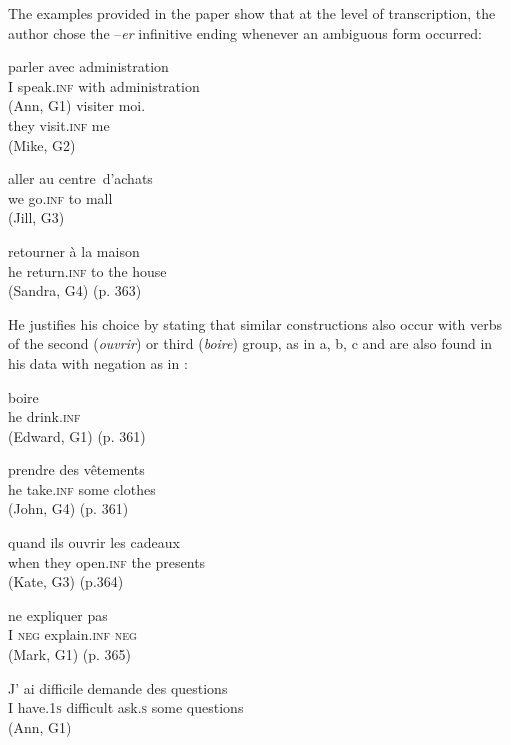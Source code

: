 \documentclass[output=paper,colorlinks,citecolor=brown,modfonts,nonflat]{../langscibook}
\begin{document}
The examples provided in the paper show that at the level of transcription, the author chose the –\textit{er} infinitive ending whenever an ambiguous form occurred:

\ea%
    \label{ex:leclerq:4}
\ea {} {parler} {avec} {administration}\\
    I speak.\textsc{inf} with administration\\
    (Ann, G1)
\ex
{} {visiter} {moi.}\\
    they visit.\textsc{inf} me\\
    (Mike, G2)

\ex
{} {aller} {au} {centre}~{d’achats}\\
    we go.\textsc{inf} to mall\\
    (Jill, G3)

\ex
{} {retourner} {à} {la} {maison}\\
    he return.\textsc{inf} to the house\\
    (Sandra, G4) (p. 363)
\z
\z

He justifies his choice by stating that similar constructions also occur with verbs of the second (\textit{ouvrir}) or third (\textit{boire}) group, as in  a, b, c and are also found in his data with negation as in :

\ea
 \label{ex:leclerq:5}
 \ea
  {boire}\\
          he drink.\textsc{inf}\\
          (Edward, G1) (p. 361)

\ex
{} {prendre} {des} {vêtements}\\
    he take.\textsc{inf} some clothes\\
    (John, G4) (p. 361)

\ex
{} {quand} {ils} {ouvrir} {les} {cadeaux}\\
      {}  when they open.\textsc{inf} the presents\\
        (Kate, G3) (p.364)
\z
\z

\ea%
    \label{ex:leclerq:6}
          {ne} {expliquer} {pas} \\
        I \textsc{neg} explain.\textsc{inf} \textsc{neg}\\
        (Mark, G1) (p. 365)
\z

\ea%
    \label{ex:leclerq:7}
\ea
\gll J’ ai         {difficile} {demande} {des} {questions}\\
         I have.1\textsc{s} difficult ask.\textsc{s} some questions\\
         (Ann, G1)
\end{document}
